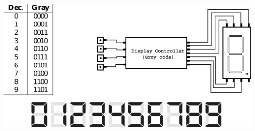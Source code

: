 \documentclass{article}
\begin{document}
\begin{center}
\includegraphics[scale=0.3]{sim1}
\end{center}
\end{document}
